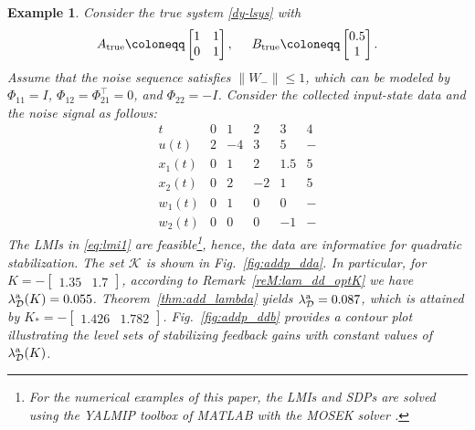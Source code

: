 \documentclass[9pt,shortpaper,twoside,web]{ieeecolor}
\newcommand{\mac}[1]{\mathcal{#1}}
\newtheorem{example}[theorem]{Example}
\begin{document}
\begin{example}
\label{ex:3}
Consider the true system \eqref{dy-lsys} with
\begin{equation}
A_\text{true}\coloneqq \begin{bmatrix}
1 & 1 \\
0 & 1
\end{bmatrix},\hspace{0.5 cm} B_\text{true}\coloneqq \begin{bmatrix}
0.5 \\
1
\end{bmatrix}.
\end{equation}
Assume that the noise sequence satisfies $\|W_-\|\leq 1$, which can be modeled by $\Phi_{11}=I$, $\Phi_{12}=\Phi_{21}^\top=0$, and $\Phi_{22}=-I$. Consider the collected input-state data and the noise signal as follows:
\begin{equation}
\label{eq:data-table}
\begin{array}{c|cccccc}
t      & 0 & 1 & 2 & 3 & 4 \\ \hline
u(t)   & 2 & -4 & 3 & 5 & - \\ \hline
x_1(t) & 0 & 1 & 2 & 1.5 & 5 \\
x_2(t) & 0 & 2 & -2 & 1 & 5 \\ \hline
w_1(t) & 0 & 1 & 0 & 0 & - \\
w_2(t) & 0 & 0 & 0 & -1 & -
\end{array}
\end{equation}
The LMIs in \eqref{eq:lmi1} are feasible\footnote{For the numerical examples of this paper, the LMIs and SDPs are solved using the YALMIP toolbox \cite{lofberg2004yalmip} of MATLAB with the MOSEK solver \cite{mosek}.}, hence, the data are informative for quadratic stabilization. The set $\mac{K}$ is shown in Fig.~\ref{fig:addp_dda}. In particular, for $K=-\begin{bmatrix}
    1.35 & 1.7
\end{bmatrix}$, according to Remark~\ref{reM:lam_dd_optK} we have \mbox{$\lambda_\mathcal{D}^\textup{a}(K)=0.055$}. Theorem~\ref{thm:add_lambda} yields $\lambda_\mathcal{D}^\textup{a}=0.087$, which is attained by $K_*=-\begin{bmatrix}
    1.426 & 1.782
\end{bmatrix}$. Fig.~\ref{fig:addp_ddb} provides a contour plot illustrating the level sets of stabilizing feedback gains with constant values of $\lambda_\mac{D}^\textup{a}(K)$.

\end{example}
\end{document}
